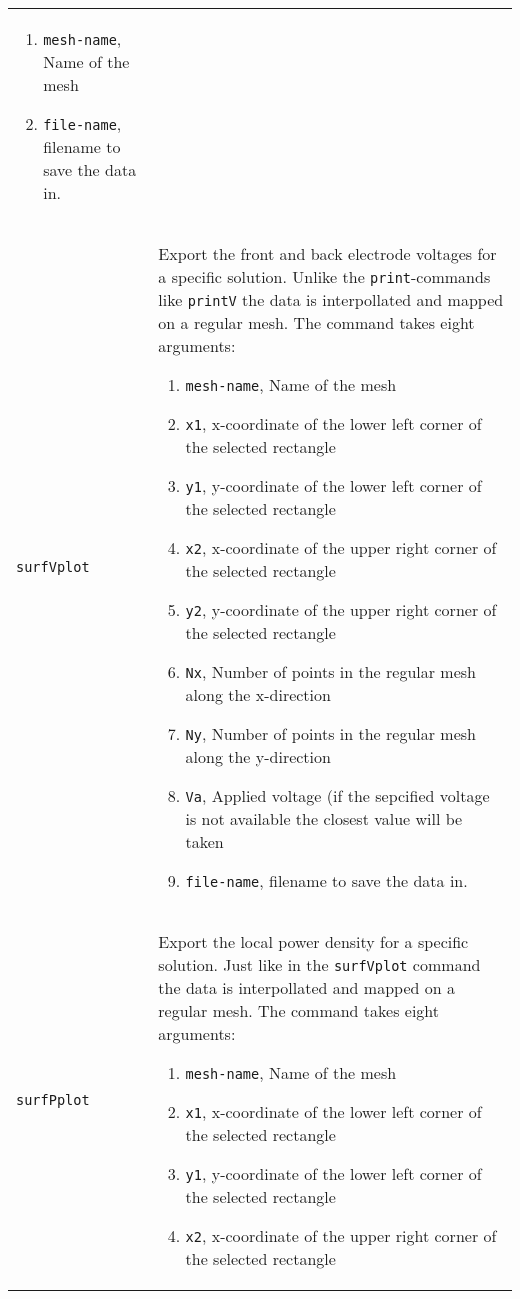 \documentclass[noshowpacs,preprintnumbers,amsmath,amssymb, letter]{revtex4}
\begin{document}
\begin{longtable}{p{}p{}}
\begin{enumerate}
\item \texttt{mesh-name}, Name of the mesh
\item \texttt{file-name}, filename to save the data in.
\end{enumerate}\\
\texttt{surfVplot}		& Export the front and back electrode voltages for a specific solution. Unlike the \texttt{print}-commands like \texttt{printV} the data is interpollated and mapped on a regular mesh. The command takes eight arguments:
\begin{enumerate}
\item \texttt{mesh-name}, Name of the mesh
\item \texttt{x1}, x-coordinate of the lower left corner of the selected rectangle
\item \texttt{y1}, y-coordinate of the lower left corner of the selected rectangle
\item \texttt{x2}, x-coordinate of the upper right corner of the selected rectangle
\item \texttt{y2}, y-coordinate of the upper right corner of the selected rectangle
\item \texttt{Nx}, Number of points in the regular mesh along the x-direction
\item \texttt{Ny}, Number of points in the regular mesh along the y-direction
\item \texttt{Va}, Applied voltage (if the sepcified voltage is not available the closest value will be taken
\item \texttt{file-name}, filename to save the data in.
\end{enumerate}\\
\texttt{surfPplot}		& Export the local power density for a specific solution. Just like in the \texttt{surfVplot} command the data is interpollated and mapped on a regular mesh. The command takes eight arguments:
\begin{enumerate}
\item \texttt{mesh-name}, Name of the mesh
\item \texttt{x1}, x-coordinate of the lower left corner of the selected rectangle
\item \texttt{y1}, y-coordinate of the lower left corner of the selected rectangle
\item \texttt{x2}, x-coordinate of the upper right corner of the selected rectangle

\end{enumerate}
\end{longtable}
\end{document}
